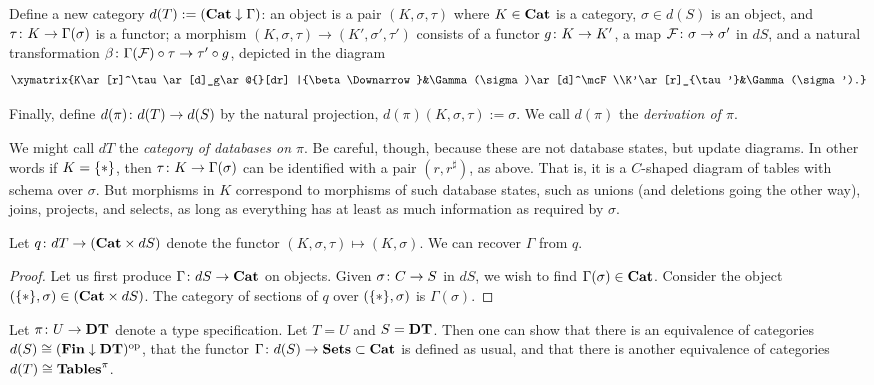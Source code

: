 \documentclass{amsart}
\begin{document}
Define a new category $d(T):=({\bf Cat}\downarrow\Gamma)$: an object is a pair $(K,\sigma,\tau)$ where $K\in{\bf Cat}$ is a category, $\sigma\in d(S)$ is an object, and $\tau\colon K\rightarrow\Gamma(\sigma)$ is a functor; a morphism $(K,\sigma,\tau)\to(K',\sigma',\tau')$ consists of a functor $g\colon K\rightarrow K'$, a map $\mathcal{F}\colon\sigma\rightarrow\sigma'$ in $dS$, and a natural transformation $\beta\colon\Gamma(\mathcal{F})\circ\tau\rightarrow\tau'\circ g$, depicted in the diagram $$\xymatrix{K\ar[r]^\tau\ar[d]_g\ar@{}[dr] |{\beta\Downarrow}&\Gamma(\sigma)\ar[d]^\mcF\\K'\ar[r]_{\tau'}&\Gamma(\sigma').}$$  

Finally, define $d(\pi)\colon d(T)\rightarrow d(S)$ by the natural projection, $d(\pi)(K,\sigma,\tau):=\sigma$.  We call $d(\pi)$ the {\em derivation of $\pi$}.  

\begin{remark}

We might call $dT$ the {\em category of databases on $\pi$}.  Be careful, though, because these are not database states, but update diagrams.  In other words if $K={\{*\}}$, then $\tau\colon K\rightarrow\Gamma(\sigma)$ can be identified with a pair $(r,r^\sharp)$, as above.  That is, it is a $C$-shaped diagram of tables with schema over $\sigma$.  But morphisms in $K$ correspond to morphisms of such database states, such as unions (and deletions going the other way), joins, projects, and selects, as long as everything has at least as much information as required by $\sigma$.

\end{remark}

\begin{lemma}

Let $q\colon dT\rightarrow({\bf Cat}\times dS)$ denote the functor $(K,\sigma,\tau)\mapsto(K,\sigma)$.  We can recover $\Gamma$ from $q$.

\end{lemma}

\begin{proof}

Let us first produce $\Gamma\colon dS\rightarrow{\bf Cat}$ on objects.  Given $\sigma\colon C\rightarrow S$ in $dS$, we wish to find $\Gamma(\sigma)\in{\bf Cat}$.  Consider the object $({\{*\}},\sigma)\in({\bf Cat}\times dS)$.  The category of sections of $q$ over $({\{*\}},\sigma)$ is $\Gamma(\sigma)$.

\end{proof}

\begin{example}

Let $\pi\colon U\rightarrow{\bf DT}$ denote a type specification.  Let $T=U$ and $S={\bf DT}$.  Then one can show that there is an equivalence of categories $d(S)\cong({\bf Fin}\downarrow{\bf DT})^\textnormal{op}$, that the functor $\Gamma\colon d(S)\rightarrow{\bf Sets}\subset{\bf Cat}$ is defined as usual, and that there is another equivalence of categories $d(T)\cong{\bf Tables}^\pi$.

\end{example}
\end{document}
